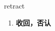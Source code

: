 
\begin{frame}
{\huge retract}
\begin{center}
\begin{enumerate}\Large
  \item \textbf{收回，否认}
\end{enumerate}
\end{center}
\end{frame}

